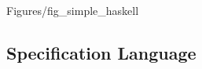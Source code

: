  {Figures/fig_simple_haskell}


\newpage
%
%
\subsection{Specification Language}
\label{subsec:spec_lang}












\newpage














\begin{comment}
Following is the formal syntax of specification language in our system:

\\ The language is general enough to cover all  the known consistency
levels in the context:

\\ Specifications written in our language, can be visualized by simple
graphs. For example, \texttt{(MR)} guarantee from the above figure can
be represented as:

\end{comment}
